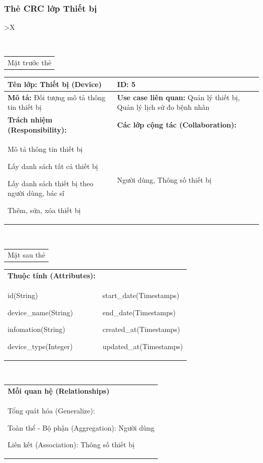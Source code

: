   \subsubsection{Thẻ CRC lớp Thiết bị}
  \begin{xltabular}{\textwidth}{
    >{\centering\arraybackslash}X 
  }
  \caption{\bfseries \fontsize{12pt}{0pt}\selectfont Thẻ CRC lớp Thiết bị}
  \\
  \begin{tabularx}{0.9\textwidth}{X}
    Mặt trước thẻ
  \end{tabularx}
  \begin{tabularx}{0.9\textwidth}{|X|X|}
    \hline
    \textbf{Tên lớp:} Thiết bị (Device) & \textbf{ID:} 5 \\
    \hline
    \textbf{Mô tả:} Đối tượng mô tả thông tin thiết bị & \textbf{Use case liên quan:} Quản lý thiết bị, Quản lý lịch sử đo bệnh nhân \\
    \hline
    \textbf{Trách nhiệm (Responsibility):} & \textbf{Các lớp cộng tác (Collaboration):} \\
    Mô tả thông tin thiết bị

    Lấy danh sách tất cả thiết bị

    Lấy danh sách thiết bị theo người dùng, bác sĩ
    
    Thêm, sửa, xóa thiết bị
    & 
    Người dùng, Thông số thiết bị 
    \\
    \hline
  \end{tabularx}
  \\ 
  \begin{tabularx}{0.9\textwidth}{X}
    Mặt sau thẻ
  \end{tabularx} 
  \begin{tabularx}{0.9\textwidth}{|X|X|}
    \hline
    \textbf{Thuộc tính (Attributes):} & \\
    id(String) 

    device\_name(String)

    infomation(String)

    device\_type(Integer)
    & 
    start\_date(Timestamps) 
    
    end\_date(Timestamps) 
    
    created\_at(Timestamps)

    updated\_at(Timestamps)
    \\
    \hline
  \end{tabularx}
  \\     
  \begin{tabularx}{0.9\textwidth}{|X|}
    \textbf{Mối quan hệ (Relationships)} \\
    Tổng quát hóa (Generalize):  

    Toàn thể - Bộ phận (Aggregation): Người dùng
      
    Liên kết (Association): Thông số thiết bị
    \\
    \hline
  \end{tabularx}
  \end{xltabular}
  \newpage
